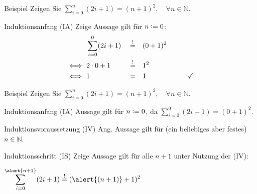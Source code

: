 \begin{frame}[fragile]{Beispiel}
    Zeigen Sie $\displaystyle\sum_{i = 0}^{n} (2i+1) = (n+1)^2,\quad\forall n \in\mathbb{N}$.
    \begin{alertblock}{Induktionsanfang (IA)}
        Zeige Aussage gilt für $n\vcentcolon=0$:\\
        \begin{align*}
                      & \sum_{i = 0}^{0} (2i+1) &  & \overset{!}{=} &  & (0+1)^2 &                  \\
            \iff\  & 2 \cdot 0 + 1           &  & \overset{!}{=} &  & 1^2     &                  \\
            \iff\  & 1                       &  & =              &  & 1       & \qquad\checkmark
        \end{align*}
    \end{alertblock}
\end{frame}

\begin{frame}[fragile]{Beispiel}
    Zeigen Sie $\displaystyle\sum_{i = 0}^{n} (2i+1) = (n+1)^2,\quad\forall n \in\mathbb{N}$.
    \begin{alertblock}{Induktionsanfang (IA)}
        Aussage gilt für $n\vcentcolon=0$, da $\displaystyle\sum_{i = 0}^{0} (2i+1) = (0+1)^2$.
    \end{alertblock}
    \begin{alertblock}{Induktionsvoraussetzung (IV)}
        Ang. Aussage gilt für (ein beliebiges aber festes) $n \in\mathbb{N}$.
    \end{alertblock}
    \begin{alertblock}{Induktionsschritt (IS)}
        Zeige Aussage gilt für alle $n+1$ unter Nutzung der (IV):\par
        $\displaystyle\sum_{i = 0}^{\alert{n+1}} (2i+1) \overset{!}{=} (\alert{(n+1)}+1)^2$
    \end{alertblock}
\end{frame}

